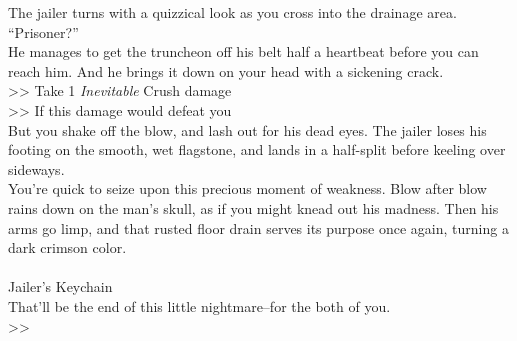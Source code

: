 The jailer turns with a quizzical look as you cross into the drainage area.\\
“Prisoner?”\\

He manages to get the truncheon off his belt half a heartbeat before you can reach him. And he brings it down on your head with a sickening crack.\\
>> Take 1 \emph{Inevitable} Crush damage\\
>> If this damage would defeat you \\

But you shake off the blow, and lash out for his dead eyes. The jailer loses his footing on the smooth, wet flagstone, and lands in a half-split before keeling over sideways.\\

You’re quick to seize upon this precious moment of weakness. Blow after blow rains down on the man’s skull, as if you might knead out his madness. Then his arms go limp, and that rusted floor drain serves its purpose once again, turning a dark crimson color.\\
\\
 Jailer’s Keychain\\

That’ll be the end of this little nightmare--for the both of you.\\
>> 